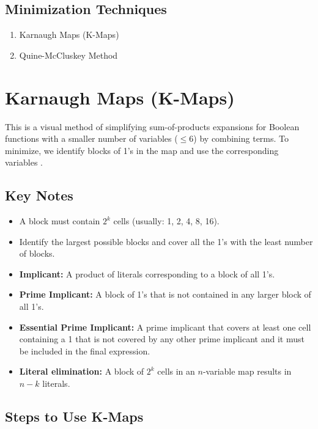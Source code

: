 \subsection{Minimization Techniques}

\begin{enumerate}
    \item Karnaugh Maps (K-Maps)
    \item Quine-McCluskey Method
\end{enumerate}

\section{Karnaugh Maps (K-Maps)}

This is a visual method of simplifying sum-of-products expansions for Boolean 
functions with a smaller number of variables ($\leq 6$) by combining terms. To 
minimize, we identify blocks of 1's in the map and use the corresponding 
variables \cite{stem2024}.

\subsection{Key Notes}

\begin{itemize}
    \item A block must contain $2^k$ cells (usually: 1, 2, 4, 8, 16).
    \item Identify the largest possible blocks and cover all the 1's with the 
    least number of blocks.
    \item \textbf{Implicant:} A product of literals corresponding to a block of 
    all 1's.
    \item \textbf{Prime Implicant:} A block of 1's that is not contained in any 
    larger block of all 1's.
    \item \textbf{Essential Prime Implicant:} A prime implicant that covers at 
    least one cell containing a 1 that is not covered by any other prime 
    implicant and it must be included in the final expression.
    \item \textbf{Literal elimination:} A block of $2^k$ cells in an $n$-variable 
    map results in $n-k$ literals.
\end{itemize}

\subsection{Steps to Use K-Maps}

